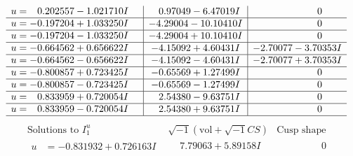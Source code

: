 \documentclass[1p]{elsarticle_modified}
\theoremstyle{definition}
\newcommand{\I}{\sqrt{-1}}
\begin{document}
$$\begin{array}{c|c|c}
\begin{aligned}
u &= \phantom{-}0.202557 - 1.021710 I\end{aligned}
 & \phantom{-}0.97049 - 6.47019 I & \phantom{-0.000000 } 0 \\ \hline\begin{aligned}
u &= -0.197204 + 1.033250 I\end{aligned}
 & -4.29004 - 10.10410 I & \phantom{-0.000000 } 0 \\ \hline\begin{aligned}
u &= -0.197204 - 1.033250 I\end{aligned}
 & -4.29004 + 10.10410 I & \phantom{-0.000000 } 0 \\ \hline\begin{aligned}
u &= -0.664562 + 0.656622 I\end{aligned}
 & -4.15092 + 4.60431 I & -2.70077 - 3.70353 I \\ \hline\begin{aligned}
u &= -0.664562 - 0.656622 I\end{aligned}
 & -4.15092 - 4.60431 I & -2.70077 + 3.70353 I \\ \hline\begin{aligned}
u &= -0.800857 + 0.723425 I\end{aligned}
 & -0.65569 + 1.27499 I & \phantom{-0.000000 } 0 \\ \hline\begin{aligned}
u &= -0.800857 - 0.723425 I\end{aligned}
 & -0.65569 - 1.27499 I & \phantom{-0.000000 } 0 \\ \hline\begin{aligned}
u &= \phantom{-}0.833959 + 0.720054 I\end{aligned}
 & \phantom{-}2.54380 - 9.63751 I & \phantom{-0.000000 } 0 \\ \hline\begin{aligned}
u &= \phantom{-}0.833959 - 0.720054 I\end{aligned}
 & \phantom{-}2.54380 + 9.63751 I & \phantom{-0.000000 } 0\\
 \hline 
 \end{array}$$\newpage$$\begin{array}{c|c|c}  
\text{Solutions to }I^u_{1}& \I (\text{vol} + \sqrt{-1}CS) & \text{Cusp shape}\\
 \hline 
\begin{aligned}
u &= -0.831932 + 0.726163 I\end{aligned}
 & \phantom{-}7.79063 + 5.89158 I & \phantom{-0.000000 } 0 \\ \hline\begin{aligned}

\end{aligned}
\end{array}$$
\end{document}

